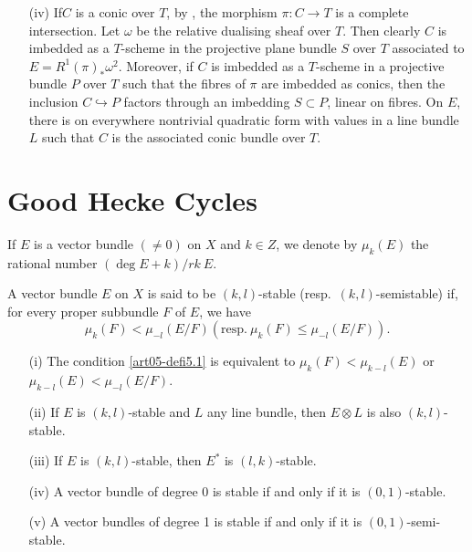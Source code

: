 \begin{remarks}
\begin{itemize}
\item[(iv)] If\pageoriginale $C$ is a conic over $T$, by \cite[SGA 6,
VII]{art05-key9}, the morphism $\pi:C\to T$ is a complete
intersection. Let $\omega$ be the relative dualising sheaf over
$T$. Then clearly $C$ is imbedded as a $T$-scheme in the projective
plane bundle $S$ over $T$ associated to
$E=R^{1}(\pi)_{*}\omega^{2}$. Moreover, if $C$ is imbedded as a
$T$-scheme in a projective bundle $P$ over $T$ such that the fibres of
$\pi$ are imbedded as conics, then the inclusion $C\hookrightarrow P$
factors through an imbedding $S\subset P$, linear on fibres. On $E$,
there is on everywhere nontrivial quadratic form with values in a line
bundle $L$ such that $C$ is the associated conic bundle over $T$.
\end{itemize}
\end{remarks}

\section{Good Hecke Cycles}\label{art05-sec5}

If $E$ is a vector bundle $(\neq 0)$ on $X$ and $k\in Z$, we denote by
$\mu_{k}(E)$ the rational number $(\deg E+k)/rk\ E$.

\begin{definition}\label{art05-defi5.1}
A vector bundle $E$ on $X$ is said to be $(k,l)$-stable
(resp.~$(k,l)$-semistable) if, for every proper subbundle $F$ of $E$,
we have
$$
\mu_{k}(F)<\mu_{-l}(E/F)(\text{resp.}~\mu_{k}(F)\leq \mu_{-l}(E/F)).
$$
\end{definition}

\begin{remark}\label{art05-rem5.2}
\begin{itemize}
\item[(i)] The condition \ref{art05-defi5.1} is equivalent to
$\mu_{k}(F)<\mu_{k-l}(E)$ or $\mu_{k-l}(E)<\mu_{-l}(E/F)$.

\item[(ii)] If $E$ is $(k,l)$-stable and $L$ any line bundle, then
$E\otimes L$ is also $(k,l)$-stable.

\item[(iii)] If $E$ is $(k,l)$-stable, then $E^{*}$ is $(l,k)$-stable.

\item[(iv)] A vector bundle of degree 0 is stable if and only if it is
$(0,1)$-stable. 

\item[(v)] A vector bundles of degree 1 is stable if and only if it is $(0,1)$-semi-stable.
\end{itemize}
\end{remark}

